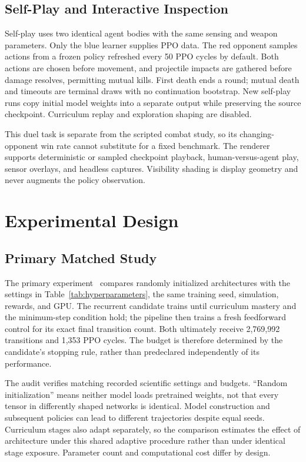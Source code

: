 \documentclass[conference]{IEEEtran}
\begin{document}
\subsection{Self-Play and Interactive Inspection}
Self-play uses two identical agent bodies with the same sensing and weapon parameters. Only the blue learner supplies PPO data. The red opponent samples actions from a frozen policy refreshed every 50 PPO cycles by default. Both actions are chosen before movement, and projectile impacts are gathered before damage resolves, permitting mutual kills. First death ends a round; mutual death and timeouts are terminal draws with no continuation bootstrap. New self-play runs copy initial model weights into a separate output while preserving the source checkpoint. Curriculum replay and exploration shaping are disabled.

This duel task is separate from the scripted combat study, so its changing-opponent win rate cannot substitute for a fixed benchmark. The renderer supports deterministic or sampled checkpoint playback, human-versus-agent play, sensor overlays, and headless captures. Visibility shading is display geometry and never augments the policy observation.

\section{Experimental Design}
\subsection{Primary Matched Study}
The primary experiment~\cite{matched} compares randomly initialized architectures with the settings in Table~\ref{tab:hyperparameters}, the same training seed, simulation, rewards, and GPU. The recurrent candidate trains until curriculum mastery and the minimum-step condition hold; the pipeline then trains a fresh feedforward control for its exact final transition count. Both ultimately receive 2,769,992 transitions and 1,353 PPO cycles. The budget is therefore determined by the candidate's stopping rule, rather than predeclared independently of its performance.

The audit verifies matching recorded scientific settings and budgets. ``Random initialization'' means neither model loads pretrained weights, not that every tensor in differently shaped networks is identical. Model construction and subsequent policies can lead to different trajectories despite equal seeds. Curriculum stages also adapt separately, so the comparison estimates the effect of architecture under this shared adaptive procedure rather than under identical stage exposure. Parameter count and computational cost differ by design.
\end{document}
